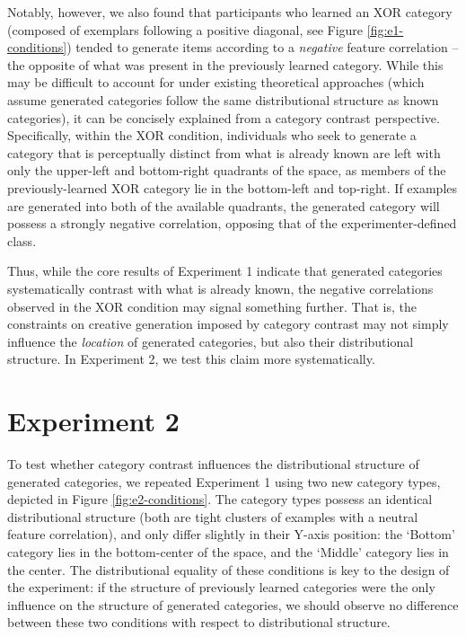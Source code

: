 \documentclass[12pt]{article}
\begin{document}
\begin{flushleft}
Notably, however, we also found that participants who learned an XOR category (composed of exemplars following a positive diagonal, see Figure \ref{fig:e1-conditions}) tended to generate items according to a \textit{negative} feature correlation -- the opposite of what was present in the previously learned category. While this may be difficult to account for under existing theoretical approaches (which assume generated categories follow the same distributional structure as known categories), it can be concisely explained from a category contrast perspective. Specifically, within the XOR condition, individuals who seek to generate a category that is perceptually distinct from what is already known are left with only the upper-left and bottom-right quadrants of the space, as members of the previously-learned XOR category lie in the bottom-left and top-right. If examples are generated into both of the available quadrants, the generated category will possess a strongly negative correlation, opposing that of the experimenter-defined class.

Thus, while the core results of Experiment 1 indicate that generated categories systematically contrast with what is already known, the negative correlations observed in the XOR condition may signal something further. That is, the constraints on creative generation imposed by category contrast may not simply influence the \textit{location} of generated categories, but also their distributional structure. In Experiment 2, we test this claim more systematically.


\section{Experiment 2}

To test whether category contrast influences the distributional structure of generated categories, we repeated Experiment 1 using two new category types, depicted in Figure \ref{fig:e2-conditions}. The category types possess an identical distributional structure (both are tight clusters of examples with a neutral feature correlation), and only differ slightly in their Y-axis position: the `Bottom' category lies in the bottom-center of the space, and the `Middle' category lies in the center. The distributional equality of these conditions is key to the design of the experiment: if the structure of previously learned categories were the only influence on the structure of generated categories, we should observe no difference between these two conditions with respect to distributional structure.


\end{flushleft}
\end{document}
